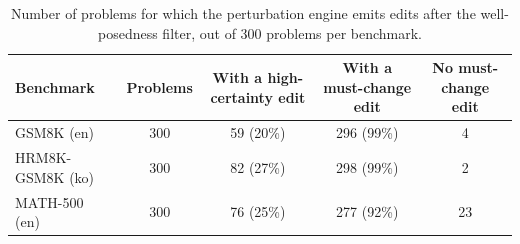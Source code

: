 \begin{table}[t]
\small\setlength{\tabcolsep}{3pt}
\caption{Number of problems for which the perturbation engine emits edits after the well-posedness filter, out of 300 problems per benchmark.\label{tab:mr}}
\begin{tabularx}{\textwidth}{lCCCC}
\toprule
\textbf{Benchmark} & \textbf{Problems} & \textbf{With a high-certainty edit} & \textbf{With a must-change edit} & \textbf{No must-change edit} \\
\midrule
GSM8K (en) & 300 & 59 (20\%) & 296 (99\%) & 4 \\
HRM8K-GSM8K (ko) & 300 & 82 (27\%) & 298 (99\%) & 2 \\
MATH-500 (en) & 300 & 76 (25\%) & 277 (92\%) & 23 \\
\bottomrule
\end{tabularx}
\end{table}
